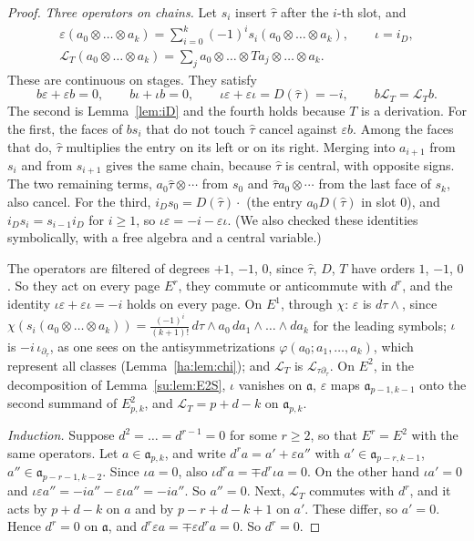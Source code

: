 \begin{proof}
\emph{Three operators on chains.} Let \(s_i\) insert \(\hat\tau\) after
the \(i\)-th slot, and
\begin{gather*}
 \varepsilon(a_0\otimes\dots\otimes a_k)=\sum_{i=0}^k(-1)^is_i(a_0\otimes
 \dots\otimes a_k),\qquad\iota=i_D,\\
 \mathcal L_T(a_0\otimes\dots\otimes a_k)=\sum_ja_0\otimes\dots\otimes
 Ta_j\otimes\dots\otimes a_k .
\end{gather*}
These are continuous on stages. They satisfy
\[
 b\varepsilon+\varepsilon b=0,\qquad b\iota+\iota b=0,\qquad
 \iota\varepsilon+\varepsilon\iota=D(\hat\tau)=-i,\qquad
 b\mathcal L_T=\mathcal L_Tb .
\]
The second is Lemma~\ref{lem:iD} and the fourth holds because \(T\) is a
derivation. For the first, the faces of \(bs_i\) that do not touch
\(\hat\tau\) cancel against \(\varepsilon b\). Among the faces that do,
\(\hat\tau\) multiplies the entry on its left or on its right. Merging
into \(a_{i+1}\) from \(s_i\) and from \(s_{i+1}\) gives the same chain,
because \(\hat\tau\) is central, with opposite signs. The two remaining
terms, \(a_0\hat\tau\otimes\cdots\) from \(s_0\) and
\(\hat\tau a_0\otimes\cdots\) from the last face of \(s_k\), also cancel.
For the third, \(i_Ds_0=D(\hat\tau)\cdot\) (the entry \(a_0D(\hat\tau)\)
in slot \(0\)), and \(i_Ds_i=s_{i-1}i_D\) for \(i\ge1\), so
\(\iota\varepsilon=-i-\varepsilon\iota\). (We also checked these
identities symbolically, with a free algebra and a central variable.)

The operators are filtered of degrees \(+1\), \(-1\), \(0\), since
\(\hat\tau\), \(D\), \(T\) have orders \(1\), \(-1\), \(0\). So they act on
every page \(E^r\), they commute or anticommute with \(d^r\), and the
identity \(\iota\varepsilon+\varepsilon\iota=-i\) holds on every page.
On \(E^1\), through \(\chi\): \(\varepsilon\) is \(d\tau\wedge\), since
\(\chi(s_i(a_0\otimes\dots\otimes a_k))=\frac{(-1)^i}{(k+1)!}\,d\tau\wedge
a_0\,da_1\wedge\dots\wedge da_k\) for the leading symbols; \(\iota\) is
\(-i\,\iota_{\partial_\tau}\), as one sees on the antisymmetrizations
\(\varphi(a_0;a_1,\dots,a_k)\), which represent all classes
(Lemma~\ref{ha:lem:chi}); and \(\mathcal L_T\) is \(\mathcal
L_{\tau\partial_\tau}\). On \(E^2\), in the decomposition of
Lemma~\ref{su:lem:E2S}, \(\iota\) vanishes on \(\mathfrak a\),
\(\varepsilon\) maps \(\mathfrak a_{p-1,k-1}\) onto the second summand of
\(E^2_{p,k}\), and \(\mathcal L_T=p+d-k\) on \(\mathfrak a_{p,k}\).

\emph{Induction.} Suppose \(d^2=\dots=d^{r-1}=0\) for some \(r\ge2\), so
that \(E^r=E^2\) with the same operators. Let \(a\in\mathfrak a_{p,k}\),
and write \(d^ra=a'+\varepsilon a''\) with \(a'\in\mathfrak
a_{p-r,k-1}\), \(a''\in\mathfrak a_{p-r-1,k-2}\). Since \(\iota a=0\), also
\(\iota d^ra=\mp d^r\iota a=0\). On the other hand \(\iota a'=0\) and
\(\iota\varepsilon a''=-ia''-\varepsilon\iota a''=-ia''\). So \(a''=0\).
Next, \(\mathcal L_T\) commutes with \(d^r\), and it acts by \(p+d-k\) on
\(a\) and by \(p-r+d-k+1\) on \(a'\). These differ, so \(a'=0\). Hence
\(d^r=0\) on \(\mathfrak a\), and \(d^r\varepsilon a=\mp\varepsilon
d^ra=0\). So \(d^r=0\).
\end{proof}

